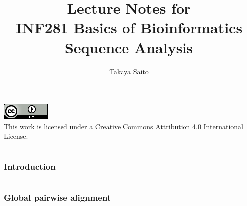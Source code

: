 \documentclass[12pt]{article}
\title{Lecture Notes for \\ INF281 Basics of Bioinformatics Sequence Analysis}
\author{Takaya Saito}
\date{}
\begin{document}
\clearpage\maketitle
\vspace{450px}
\includegraphics[scale=1]{fig00/88x31.png} \\
This work is licensed under a Creative Commons Attribution 4.0 International License.
\thispagestyle{empty}
\pagebreak

\setcounter{page}{1}
\tableofcontents
\pagebreak

\setcounter{page}{1}

\makeatletter 
\renewcommand{\thefigure}{\arabic{section}.\arabic{figure}}
\renewcommand{\thetable}{\arabic{section}.\arabic{table}}
\makeatother

%
%
\part{}

%
%
\setcounter{figure}{0}
\setcounter{table}{0}
\section{Introduction}




\newpage

%
%
\part{}

%
%
\setcounter{figure}{0}
\setcounter{table}{0}
\section{Global pairwise alignment}







\newpage

%
%
\setcounter{figure}{0}
\setcounter{table}{0}
\end{document}
